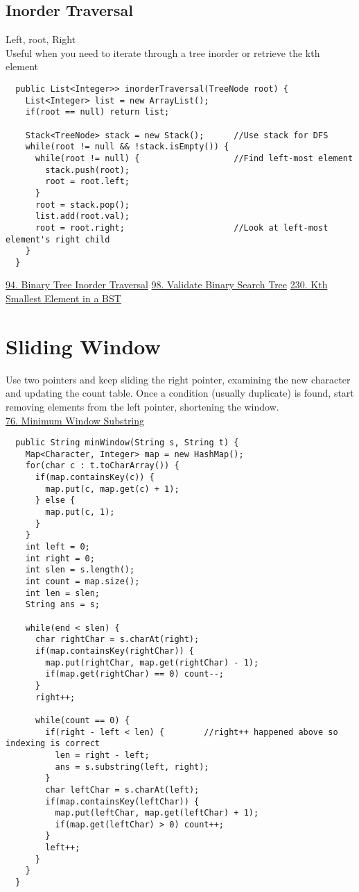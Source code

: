 \documentclass{article}
\begin{document}
  \subsection{Inorder Traversal}
  Left, root, Right \\
  Useful when you need to iterate through a tree inorder or retrieve the kth element
  \begin{lstlisting}
  public List<Integer>> inorderTraversal(TreeNode root) {
    List<Integer> list = new ArrayList();
    if(root == null) return list;
    
    Stack<TreeNode> stack = new Stack();      //Use stack for DFS
    while(root != null && !stack.isEmpty()) {
      while(root != null) {                   //Find left-most element
        stack.push(root);
        root = root.left;
      }
      root = stack.pop();
      list.add(root.val);
      root = root.right;                      //Look at left-most element's right child
    }
  }
  \end{lstlisting}
  \href{https://leetcode.com/problems/binary-tree-inorder-traversal/description/}{94. Binary Tree Inorder Traversal} \quad \href{https://leetcode.com/problems/validate-binary-search-tree/}{98. Validate Binary Search Tree} \quad \href{https://leetcode.com/problems/kth-smallest-element-in-a-bst/solution/}{230. Kth Smallest Element in a BST}

  \section{Sliding Window}
  Use two pointers and keep sliding the right pointer, examining the new character and updating the count table. Once a condition (usually duplicate) is found, start removing elements from the left pointer, shortening the window.\\
  \href{https://leetcode.com/problems/minimum-window-substring/description/}{76. Minimum Window Substring}
  \begin{lstlisting}
  public String minWindow(String s, String t) {
    Map<Character, Integer> map = new HashMap();
    for(char c : t.toCharArray()) {
      if(map.containsKey(c)) {
        map.put(c, map.get(c) + 1);
      } else {
        map.put(c, 1);
      }
    }
    int left = 0;
    int right = 0;
    int slen = s.length();
    int count = map.size();
    int len = slen;
    String ans = s;

    while(end < slen) {
      char rightChar = s.charAt(right);
      if(map.containsKey(rightChar)) {
        map.put(rightChar, map.get(rightChar) - 1);
        if(map.get(rightChar) == 0) count--;
      }
      right++;

      while(count == 0) {
        if(right - left < len) {        //right++ happened above so indexing is correct
          len = right - left;
          ans = s.substring(left, right);
        }
        char leftChar = s.charAt(left);
        if(map.containsKey(leftChar)) {
          map.put(leftChar, map.get(leftChar) + 1);
          if(map.get(leftChar) > 0) count++;
        }
        left++;
      }
    }
  }
  \end{lstlisting}
\end{document}

